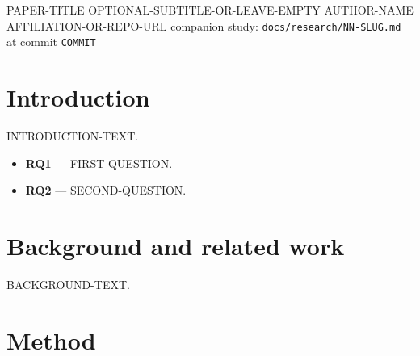 \documentclass[11pt,a4paper]{article}
\begin{document}
\housetitle
    {PAPER-TITLE}
    {OPTIONAL-SUBTITLE-OR-LEAVE-EMPTY}
    {AUTHOR-NAME}
    {AFFILIATION-OR-REPO-URL}
    {companion study: \texttt{docs/research/NN-SLUG.md} at commit \texttt{COMMIT}}

\begin{abstract}
\noindent ABSTRACT-TEXT.
\end{abstract}

\vspace{0.4cm}

\section{Introduction}

INTRODUCTION-TEXT.

\begin{itemize}[leftmargin=*]
    \item \textbf{RQ1} --- FIRST-QUESTION.
    \item \textbf{RQ2} --- SECOND-QUESTION.
\end{itemize}

\section{Background and related work}

BACKGROUND-TEXT.

\section{Method}
\end{document}
